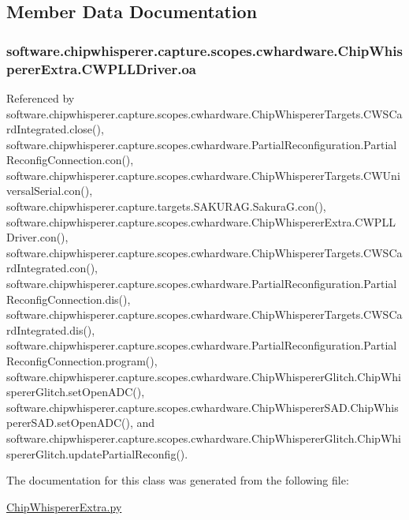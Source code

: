 \subsection{Member Data Documentation}
\hypertarget{classsoftware_1_1chipwhisperer_1_1capture_1_1scopes_1_1cwhardware_1_1ChipWhispererExtra_1_1CWPLLDriver_a650f1d358411a7a3cc68cac107516d19}{}
\subsubsection[{oa}]{\setlength{\rightskip}{0pt plus 5cm}software.\+chipwhisperer.\+capture.\+scopes.\+cwhardware.\+Chip\+Whisperer\+Extra.\+C\+W\+P\+L\+L\+Driver.\+oa}\label{classsoftware_1_1chipwhisperer_1_1capture_1_1scopes_1_1cwhardware_1_1ChipWhispererExtra_1_1CWPLLDriver_a650f1d358411a7a3cc68cac107516d19}


Referenced by software.\+chipwhisperer.\+capture.\+scopes.\+cwhardware.\+Chip\+Whisperer\+Targets.\+C\+W\+S\+Card\+Integrated.\+close(), software.\+chipwhisperer.\+capture.\+scopes.\+cwhardware.\+Partial\+Reconfiguration.\+Partial\+Reconfig\+Connection.\+con(), software.\+chipwhisperer.\+capture.\+scopes.\+cwhardware.\+Chip\+Whisperer\+Targets.\+C\+W\+Universal\+Serial.\+con(), software.\+chipwhisperer.\+capture.\+targets.\+S\+A\+K\+U\+R\+A\+G.\+Sakura\+G.\+con(), software.\+chipwhisperer.\+capture.\+scopes.\+cwhardware.\+Chip\+Whisperer\+Extra.\+C\+W\+P\+L\+L\+Driver.\+con(), software.\+chipwhisperer.\+capture.\+scopes.\+cwhardware.\+Chip\+Whisperer\+Targets.\+C\+W\+S\+Card\+Integrated.\+con(), software.\+chipwhisperer.\+capture.\+scopes.\+cwhardware.\+Partial\+Reconfiguration.\+Partial\+Reconfig\+Connection.\+dis(), software.\+chipwhisperer.\+capture.\+scopes.\+cwhardware.\+Chip\+Whisperer\+Targets.\+C\+W\+S\+Card\+Integrated.\+dis(), software.\+chipwhisperer.\+capture.\+scopes.\+cwhardware.\+Partial\+Reconfiguration.\+Partial\+Reconfig\+Connection.\+program(), software.\+chipwhisperer.\+capture.\+scopes.\+cwhardware.\+Chip\+Whisperer\+Glitch.\+Chip\+Whisperer\+Glitch.\+set\+Open\+A\+D\+C(), software.\+chipwhisperer.\+capture.\+scopes.\+cwhardware.\+Chip\+Whisperer\+S\+A\+D.\+Chip\+Whisperer\+S\+A\+D.\+set\+Open\+A\+D\+C(), and software.\+chipwhisperer.\+capture.\+scopes.\+cwhardware.\+Chip\+Whisperer\+Glitch.\+Chip\+Whisperer\+Glitch.\+update\+Partial\+Reconfig().



The documentation for this class was generated from the following file\+:\begin{DoxyCompactItemize}
\item 
\hyperlink{ChipWhispererExtra_8py}{Chip\+Whisperer\+Extra.\+py}\end{DoxyCompactItemize}
